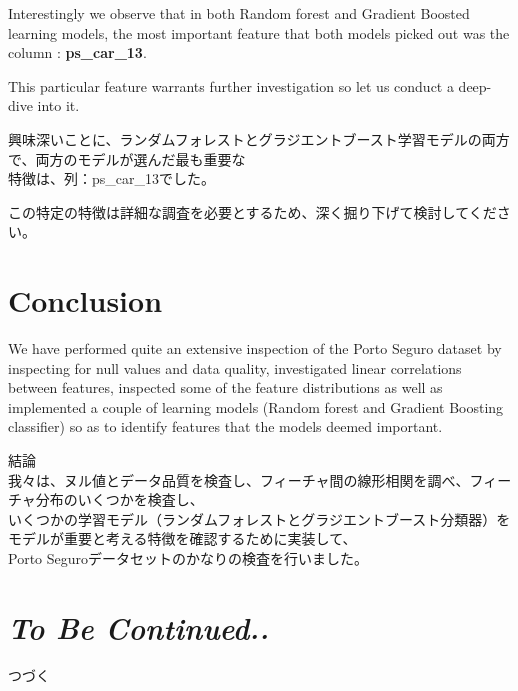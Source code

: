 \documentclass[11pt]{article}
\begin{document}
    
    
    Interestingly we observe that in both Random forest and Gradient Boosted
learning models, the most important feature that both models picked out
was the column : \textbf{ps\_car\_13}.

This particular feature warrants further investigation so let us conduct
a deep-dive into it.

    興味深いことに、ランダムフォレストとグラジエントブースト学習モデルの両方で、両方のモデルが選んだ最も重要な\\
特徴は、列：ps\_car\_13でした。

この特定の特徴は詳細な調査を必要とするため、深く掘り下げて検討してください。

    \section{Conclusion}\label{conclusion}

We have performed quite an extensive inspection of the Porto Seguro
dataset by inspecting for null values and data quality, investigated
linear correlations between features, inspected some of the feature
distributions as well as implemented a couple of learning models (Random
forest and Gradient Boosting classifier) so as to identify features that
the models deemed important.

    結論\\
我々は、ヌル値とデータ品質を検査し、フィーチャ間の線形相関を調べ、フィーチャ分布のいくつかを検査し、\\
いくつかの学習モデル（ランダムフォレストとグラジエントブースト分類器）をモデルが重要と考える特徴を確認するために実装して、\\
Porto Seguroデータセットのかなりの検査を行いました。

    \section{\texorpdfstring{\emph{To Be
Continued..}}{To Be Continued..}}\label{to-be-continued..}

    つづく


    
    
    
    
\end{document}
